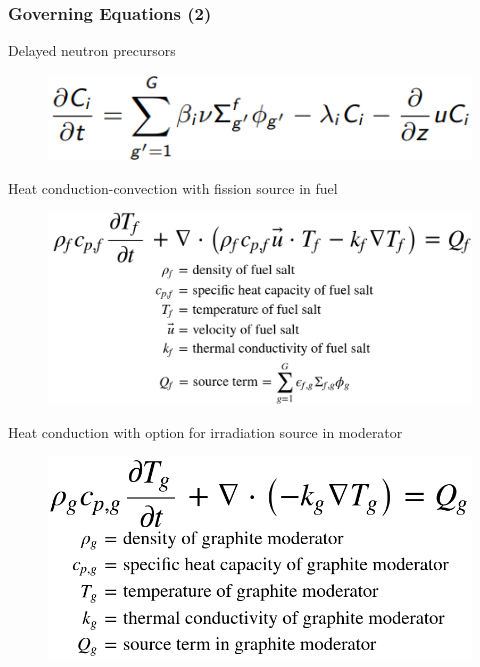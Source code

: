 \begin{frame}
  \frametitle{Governing Equations (2)}
     \begin{block}{Delayed neutron precursors}
               \begin{figure}[t]
                 \vspace*{-0.05in}
                \includegraphics[height=0.07\textwidth]{./images/delayed_neutrons.png}
               \end{figure}   
     \end{block}
     
     \begin{block}{Heat conduction-convection with fission source in fuel}
              \begin{figure}[t]
                 \vspace*{-0.05in}
                \includegraphics[height=0.21\textwidth]{./images/fuel_temp.png}
               \end{figure}        
	\end{block}
	
     \begin{block}{Heat conduction with option for irradiation source in moderator}
              \begin{figure}[t]
                 \vspace*{-0.05in}
                 \includegraphics[height=0.17\textwidth]{./images/moder_temp.png}
               \end{figure}        
	\end{block}
\end{frame}

